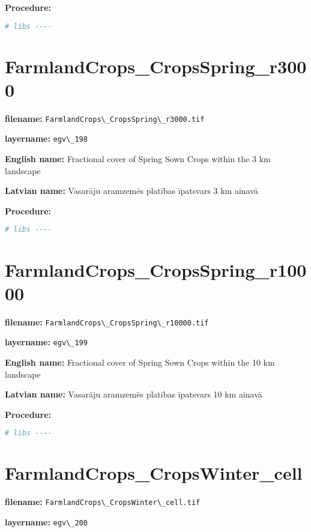 \documentclass[
]{book}
\newcommand{\passthrough}[1]{#1}
\begin{document}
\textbf{Procedure:}

\begin{lstlisting}[language=R]
# libs ----
\end{lstlisting}

\section{FarmlandCrops\_CropsSpring\_r3000}\label{ch06.198}

\textbf{filename:} \passthrough{\lstinline!FarmlandCrops\_CropsSpring\_r3000.tif!}

\textbf{layername:} \passthrough{\lstinline!egv\_198!}

\textbf{English name:} Fractional cover of Spring Sown Crops within the 3 km landscape

\textbf{Latvian name:} Vasarāju aramzemēs platības īpatsvars 3 km ainavā

\textbf{Procedure:}

\begin{lstlisting}[language=R]
# libs ----
\end{lstlisting}

\section{FarmlandCrops\_CropsSpring\_r10000}\label{ch06.199}

\textbf{filename:} \passthrough{\lstinline!FarmlandCrops\_CropsSpring\_r10000.tif!}

\textbf{layername:} \passthrough{\lstinline!egv\_199!}

\textbf{English name:} Fractional cover of Spring Sown Crops within the 10 km landscape

\textbf{Latvian name:} Vasarāju aramzemēs platības īpatsvars 10 km ainavā

\textbf{Procedure:}

\begin{lstlisting}[language=R]
# libs ----
\end{lstlisting}

\section{FarmlandCrops\_CropsWinter\_cell}\label{ch06.200}

\textbf{filename:} \passthrough{\lstinline!FarmlandCrops\_CropsWinter\_cell.tif!}

\textbf{layername:} \passthrough{\lstinline!egv\_200!}
\end{document}

